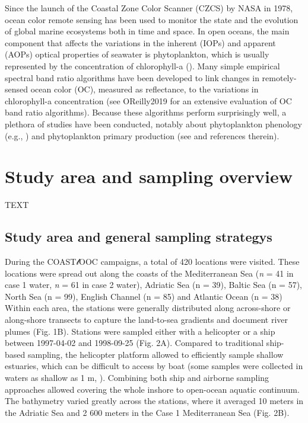 \documentclass[essd, manuscript]{copernicus}
\begin{document}


\introduction  %

Since the launch of the Coastal Zone Color Scanner (CZCS) by NASA in 1978, ocean color remote sensing has been used to monitor the state and the evolution of global marine ecosystems both in time and space. In open oceans, the main component that affects the variations in the inherent (IOPs) and apparent (AOPs) optical properties of seawater is phytoplankton, which is usually represented by the concentration of chlorophyll-a (\citep{Morel1977}). Many simple empirical spectral band ratio algorithms have been developed to link changes in remotely-sensed ocean color (OC), measured as reflectance, to the variations in chlorophyll-a concentration (see OReilly2019 for an extensive evaluation of OC band ratio algorithms). Because these algorithms perform surprisingly well, a plethora of studies have been conducted, notably about phytoplankton phenology (e.g., \citealt{Vargas2009}) and phytoplankton primary production (see \citealt{Carr2006} and references therein).

\section{Study area and sampling overview}
TEXT


\subsection{Study area and general sampling strategys}

During the COAST$\mathscr{l}$OOC campaigns, a total of 420 locations were visited. These locations were spread out along the coasts of the Mediterranean Sea (\textit{n} = 41 in case 1 water, \textit{n} = 61 in case 2 water), Adriatic Sea (n = 39), Baltic Sea (n = 57), North Sea (n = 99), English Channel (n = 85) and Atlantic Ocean (n = 38) Within each area, the stations were generally distributed along across-shore or along-shore transects to capture the land-to-sea gradients and document river plumes (Fig. 1B). Stations were sampled either with a helicopter or a ship between 1997-04-02 and 1998-09-25 (Fig. 2A). Compared to traditional ship-based sampling, the helicopter platform allowed to efficiently sample shallow estuaries, which can be difficult to access by boat (some samples were collected in waters as shallow as 1 m, \citealt{Babin2003}). Combining both ship and airborne sampling approaches allowed covering the whole inshore to open-ocean aquatic continuum. The bathymetry \citep{GEBCO2020} varied greatly across the stations, where it averaged 10 meters in the Adriatic Sea and 2 600 meters in the Case 1 Mediterranean Sea (Fig. 2B).
\end{document}

